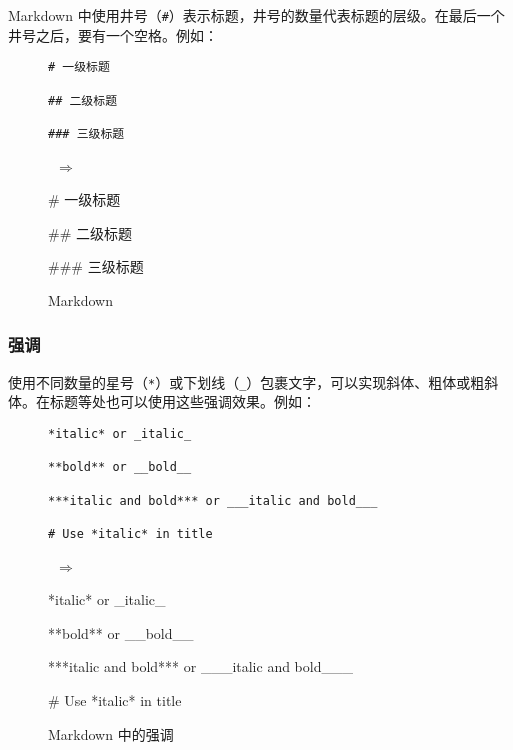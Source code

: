 \documentclass[a4paper,fontset=none]{ctexart}
\begin{document}
Markdown 中使用井号（\verb|#|）表示标题，井号的数量代表标题的层级。在最后一个井号之后，要有一个空格。例如：

\begin{figure}[H]
    \centering
    \begin{minipage}{0.45\textwidth}
        \begin{verbatim}
# 一级标题

## 二级标题

### 三级标题
        \end{verbatim}
    \end{minipage}
    \, $\Longrightarrow$ \,
    \begin{minipage}{0.45\textwidth}
\begin{markdown}
# 一级标题

## 二级标题

### 三级标题
\end{markdown}
    \end{minipage}
    \caption{Markdown}
\end{figure}

\subsubsection{强调}

使用不同数量的星号（\verb|*|）或下划线（\verb|_|）包裹文字，可以实现斜体、粗体或粗斜体。在标题等处也可以使用这些强调效果。例如：

\begin{figure}[H]
    \centering
    \begin{minipage}{0.45\textwidth}
        \begin{verbatim}
*italic* or _italic_

**bold** or __bold__

***italic and bold*** or ___italic and bold___

# Use *italic* in title
        \end{verbatim}
    \end{minipage}
    \, $\Longrightarrow$ \,
    \begin{minipage}{0.45\textwidth}
\begin{markdown}
*italic* or _italic_

**bold** or __bold__

***italic and bold*** or ___italic and bold___

# Use *italic* in title
\end{markdown}
    \end{minipage}
    \caption{Markdown 中的强调}
\end{figure}
\end{document}
